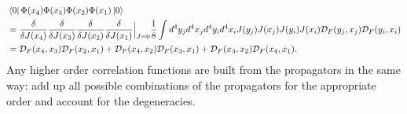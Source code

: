 \begin{equation}
\begin{split}
&\bra{0}\Phi(x_4)\Phi(x_3)\Phi(x_2)\Phi(x_1)\ket{0} \\
&= \frac{\delta}{\delta J(x_4)}\frac{\delta}{\delta J(x_3)}\frac{\delta}{\delta J(x_2)}\frac{\delta}{\delta J(x_1)}\Big|_{J=0} 
\frac{1}{8}\int d^4y_j d^4x_j d^4y_i d^4x_i J(y_j) J(x_j) J(y_i) J(x_i) \mathcal{D}_F(y_j,x_j) \mathcal{D}_F(y_i,x_i) \\ 
&= \mathcal{D}_F(x_4, x_3) \mathcal{D}_F(x_2, x_1) + \mathcal{D}_F(x_4, x_2) \mathcal{D}_F(x_3, x_1) + \mathcal{D}_F(x_3, x_2) \mathcal{D}_F(x_4, x_1).
\end{split}
\end{equation}
Any higher order correlation functions are built from the propagators in the same way: add up all possible combinations of the propagators for the appropriate order and account for the degeneracies. 

